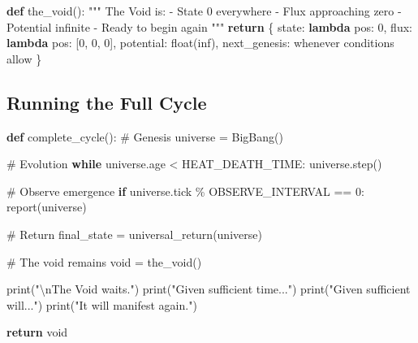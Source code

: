 \documentclass[
  11pt,
  letterpaper,
  twoside,
  openright]{book}
\newenvironment{Shaded}{\begin{snugshade}}{\end{snugshade}}
\newcommand{\BuiltInTok}[1]{\textcolor[rgb]{0.00,0.23,0.31}{#1}}
\newcommand{\CharTok}[1]{\textcolor[rgb]{0.13,0.47,0.30}{#1}}
\newcommand{\CommentTok}[1]{\textcolor[rgb]{0.37,0.37,0.37}{#1}}
\newcommand{\ControlFlowTok}[1]{\textcolor[rgb]{0.00,0.23,0.31}{\textbf{#1}}}
\newcommand{\DecValTok}[1]{\textcolor[rgb]{0.68,0.00,0.00}{#1}}
\newcommand{\KeywordTok}[1]{\textcolor[rgb]{0.00,0.23,0.31}{\textbf{#1}}}
\newcommand{\NormalTok}[1]{\textcolor[rgb]{0.00,0.23,0.31}{#1}}
\newcommand{\OperatorTok}[1]{\textcolor[rgb]{0.37,0.37,0.37}{#1}}
\newcommand{\StringTok}[1]{\textcolor[rgb]{0.13,0.47,0.30}{#1}}
\begin{document}
\begin{Shaded}
\begin{Highlighting}[]
\KeywordTok{def}\NormalTok{ the\_void():}
    \CommentTok{"""}
\CommentTok{    The Void is:}
\CommentTok{    {-} State 0 everywhere}
\CommentTok{    {-} Flux approaching zero}
\CommentTok{    {-} Potential infinite}
\CommentTok{    {-} Ready to begin again}
\CommentTok{    """}
    \ControlFlowTok{return}\NormalTok{ \{}
        \StringTok{\textquotesingle{}state\textquotesingle{}}\NormalTok{: }\KeywordTok{lambda}\NormalTok{ pos: }\DecValTok{0}\NormalTok{,}
        \StringTok{\textquotesingle{}flux\textquotesingle{}}\NormalTok{: }\KeywordTok{lambda}\NormalTok{ pos: [}\DecValTok{0}\NormalTok{, }\DecValTok{0}\NormalTok{, }\DecValTok{0}\NormalTok{],}
        \StringTok{\textquotesingle{}potential\textquotesingle{}}\NormalTok{: }\BuiltInTok{float}\NormalTok{(}\StringTok{\textquotesingle{}inf\textquotesingle{}}\NormalTok{),}
        \StringTok{\textquotesingle{}next\_genesis\textquotesingle{}}\NormalTok{: }\StringTok{\textquotesingle{}whenever conditions allow\textquotesingle{}}
\NormalTok{    \}}
\end{Highlighting}
\end{Shaded}

\subsection{Running the Full Cycle}\label{running-the-full-cycle}

\begin{Shaded}
\begin{Highlighting}[]
\KeywordTok{def}\NormalTok{ complete\_cycle():}
    \CommentTok{\# Genesis}
\NormalTok{    universe }\OperatorTok{=}\NormalTok{ BigBang()}

    \CommentTok{\# Evolution}
    \ControlFlowTok{while}\NormalTok{ universe.age }\OperatorTok{\textless{}}\NormalTok{ HEAT\_DEATH\_TIME:}
\NormalTok{        universe.step()}

        \CommentTok{\# Observe emergence}
        \ControlFlowTok{if}\NormalTok{ universe.tick }\OperatorTok{\%}\NormalTok{ OBSERVE\_INTERVAL }\OperatorTok{==} \DecValTok{0}\NormalTok{:}
\NormalTok{            report(universe)}

    \CommentTok{\# Return}
\NormalTok{    final\_state }\OperatorTok{=}\NormalTok{ universal\_return(universe)}

    \CommentTok{\# The void remains}
\NormalTok{    void }\OperatorTok{=}\NormalTok{ the\_void()}

    \BuiltInTok{print}\NormalTok{(}\StringTok{"}\CharTok{\textbackslash{}n}\StringTok{The Void waits."}\NormalTok{)}
    \BuiltInTok{print}\NormalTok{(}\StringTok{"Given sufficient time..."}\NormalTok{)}
    \BuiltInTok{print}\NormalTok{(}\StringTok{"Given sufficient will..."}\NormalTok{)}
    \BuiltInTok{print}\NormalTok{(}\StringTok{"It will manifest again."}\NormalTok{)}

    \ControlFlowTok{return}\NormalTok{ void}
\end{Highlighting}
\end{Shaded}
\end{document}
